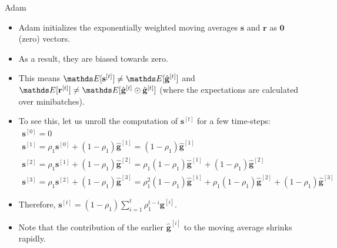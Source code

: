 \documentclass[11pt,compress,t,notes=noshow, xcolor=table]{beamer}
\begin{document}
\begin{vbframe}{Adam}
\begin{algorithm}[H]
\begin{algorithmic}[1]
			\EndWhile
		\end{algorithmic}
	\end{algorithm}
	
	
	\framebreak
	
	
	\begin{itemize}
		\item Adam initializes the exponentially weighted moving averages $\mathbf{s}$ and $\mathbf{r}$ as $\mathbf{0}$ (zero) vectors.
		\item As a result, they are biased towards zero. 
		\item This means $\E[\mathbf{s}^{[t]}] \neq \E [\hat{\mathbf{g}}^{[t]}]$ and $\E[\mathbf{r}^{[t]}] \neq \E [\hat{\mathbf{g}}^{[t]} \odot \hat{\mathbf{g}}^{[t]}]$ (where the expectations are calculated over minibatches).
		\item To see this, let us unroll the computation of $\mathbf{s}^{[t]}$ for a few time-steps:
		\footnotesize
		\begin{gather*}
		\mathbf{s}^{[0]} = 0 \\
		\mathbf{s}^{[1]} = \rho_1\mathbf{s}^{[0]} + (1 - \rho_1) \hat{\mathbf{g}}^{[1]} = (1 - \rho_1) \hat{\mathbf{g}}^{[1]} \\
		\mathbf{s}^{[2]} = \rho_1\mathbf{s}^{[1]} + (1 - \rho_1) \hat{\mathbf{g}}^{[2]} = \rho_1 (1 - \rho_1) \hat{\mathbf{g}}^{[1]} + (1 - \rho_1) \hat{\mathbf{g}}^{[2]} \\
		\mathbf{s}^{[3]} = \rho_1\mathbf{s}^{[2]} + (1 - \rho_1) \hat{\mathbf{g}}^{[3]} = \rho_1^2 (1 - \rho_1) \hat{\mathbf{g}}^{[1]} + \rho_1 (1 - \rho_1) \hat{\mathbf{g}}^{[2]} + (1 - \rho_1) \hat{\mathbf{g}}^{[3]}
		\end{gather*}
		\normalsize
		\item Therefore, $\mathbf{s}^{[t]}  = (1 - \rho_1) \sum_{i=1}^t \rho_1^{t - i} \mathbf{g}^{[i]}$.
		\item Note that the contribution of the earlier $\hat{\mathbf{g}}^{[i]}$ to the moving average shrinks rapidly.
	\end{itemize}
	
	\framebreak
	

\end{vbframe}
\end{document}
